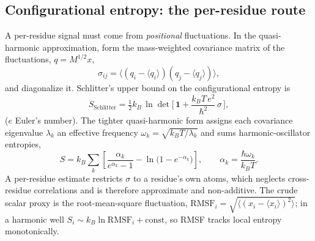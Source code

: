 \subsection{Configurational entropy: the per-residue route}
A per-residue signal must come from \emph{positional} fluctuations. In the quasi-harmonic
approximation, form the mass-weighted covariance matrix of the fluctuations, $q = M^{1/2}x$,
\begin{equation}
\sigma_{ij} = \big\langle (q_i - \langle q_i\rangle)(q_j - \langle q_j\rangle)\big\rangle ,
\end{equation}
and diagonalize it. Schlitter's upper bound on the configurational entropy is
\begin{equation}
S_{\mathrm{Schlitter}} = \tfrac{1}{2} k_B \,
   \ln\det\!\Big[\, \mathbf{1} + \frac{k_B T\, e^2}{\hbar^2}\,\sigma \,\Big] ,
\end{equation}
($e$ Euler's number). The tighter quasi-harmonic form assigns each covariance eigenvalue $\lambda_k$
an effective frequency $\omega_k = \sqrt{k_B T/\lambda_k}$ and sums harmonic-oscillator entropies,
\begin{equation}
S = k_B \sum_k \left[ \frac{\alpha_k}{e^{\alpha_k}-1} - \ln\!\big(1 - e^{-\alpha_k}\big)\right],
\qquad \alpha_k = \frac{\hbar\omega_k}{k_B T} .
\end{equation}
A per-residue estimate restricts $\sigma$ to a residue's own atoms, which neglects cross-residue
correlations and is therefore approximate and non-additive. The crude scalar proxy is the
root-mean-square fluctuation, $\mathrm{RMSF}_i = \sqrt{\langle (x_i-\langle x_i\rangle)^2\rangle}$; in
a harmonic well $S_i \sim k_B \ln \mathrm{RMSF}_i + \text{const}$, so RMSF tracks local entropy
monotonically.

